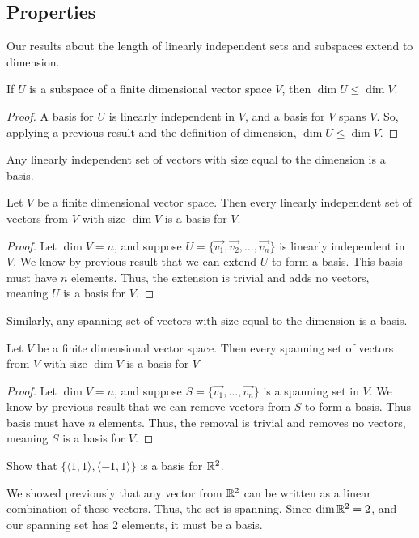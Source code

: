 
\subsection{Properties}
Our results about the length of linearly independent sets and subspaces extend to dimension.
\begin{theorem}
	If $U$ is a subspace of a finite dimensional vector space $V$, then $\dim{U} \leq \dim{V}$.
\end{theorem}
\begin{proof}
	A basis for $U$ is linearly independent in $V$, and a basis for $V$ spans $V$.
	So, applying a previous result and the definition of dimension, $\dim{U} \leq \dim{V}$.
\end{proof}

Any linearly independent set of vectors with size equal to the dimension is a basis.
\begin{theorem}
	Let $V$ be a finite dimensional vector space.
	Then every linearly independent set of vectors from $V$ with size $\dim{V}$ is a basis for $V$.
\end{theorem}
\begin{proof}
	Let $\dim{V} = n$, and suppose $U = \{\vec{v_1}, \vec{v_2}, \dots, \vec{v_n}\}$ is linearly independent in $V$.
	We know by previous result that we can extend $U$ to form a basis.
	This basis must have $n$ elements.
	Thus, the extension is trivial and adds no vectors, meaning $U$ is a basis for $V$.
\end{proof}

Similarly, any spanning set of vectors with size equal to the dimension is a basis.
\begin{theorem}
	Let $V$ be a finite dimensional vector space.
	Then every spanning set of vectors from $V$ with size $\dim{V}$ is a basis for $V$
\end{theorem}
\begin{proof}
	Let $\dim{V} = n$, and suppose $S = \{\vec{v_1}, \dots, \vec{v_n}\}$ is a spanning set in $V$.
	We know by previous result that we can remove vectors from $S$ to form a basis.
	Thus basis must have $n$ elements.
	Thus, the removal is trivial and removes no vectors, meaning $S$ is a basis for $V$.
\end{proof}

\begin{example}
	Show that $\{\langle 1, 1 \rangle, \langle -1, 1 \rangle\}$ is a basis for $\mathbb{R}^2$.
\end{example}
\begin{answer}
	We showed previously that any vector from $\mathbb{R}^2$ can be written as a linear combination of these vectors.
	Thus, the set is spanning.
	Since $\dim{\mathbb{R}^2} = 2$, and our spanning set has 2 elements, it must be a basis.
\end{answer}